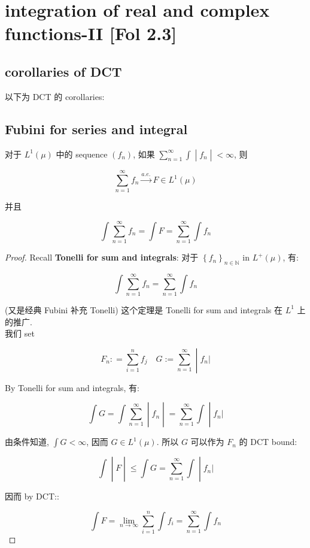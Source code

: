 \section{integration of real and complex functions-II {[}Fol 2.3{]}}

\subsection{corollaries of DCT}\label{corollaries-of-dct}

以下为 DCT 的 corollaries:

\subsection{Fubini for series and integral}\label{fubini-for-series-and-integral}

\begin{corollary}{}

对于 \(L^{1}(\mu)\) 中的 sequence \((f_{n})\), 如果 \(\left. \sum_{n = 1}^{\infty}\int \middle| f_{n} \middle| < \infty \right.\), 则

\[\sum\limits_{n = 1}^{\infty}f_{n}\overset{a.e.}{\rightarrow}F \in L^{1}(\mu)\]

并且

\[\int\sum\limits_{n = 1}^{\infty}f_{n} = \int F = \sum\limits_{n = 1}^{\infty}\int f_{n}\]

\end{corollary}

\begin{proof}

Recall \textbf{Tonelli for sum and integrals}: 对于 \(\left\{ f_{n} \right\}_{n \in \mathbb{N}}\) in \(L^{+}(\mu)\), 有:

\[\int\sum\limits_{n = 1}^{\infty}f_{n} = \sum\limits_{n = 1}^{\infty}\int f_{n}\]

(又是经典 Fubini 补充 Tonelli) 这个定理是 Tonelli for sum and integrals 在 \(L^{1}\) 上的推广.\\
我们 set

\[\left. F_{n}: = \sum\limits_{i = 1}^{n}f_{j}\quad G := \sum\limits_{n = 1}^{\infty} \middle| f_{n}| \right.\]

By Tonelli for sum and integrals, 有:

\[\left. \int G = \int\sum\limits_{n = 1}^{\infty} \middle| f_{n} \middle| = \sum\limits_{n = 1}^{\infty}\int \middle| f_{n}| \right.\]

由条件知道, \(\int G < \infty\), 因而 \(G \in L^{1}(\mu)\). 所以 \(G\) 可以作为 \(F_{n}\) 的 DCT bound:

\[\left. \int \middle| F \middle| \leq \int G = \sum\limits_{n = 1}^{\infty}\int \middle| f_{n}| \right.\]

因而 by DCT::

\[\int F = \lim\limits_{n\rightarrow\infty}\sum\limits_{i = 1}^{n}\int f_{i} = \sum\limits_{n = 1}^{\infty}\int f_{n}\]

\end{proof}

